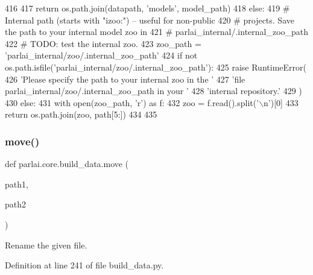 \begin{DoxyCode}
416 
417         \textcolor{keywordflow}{return} os.path.join(datapath, \textcolor{stringliteral}{'models'}, model\_path)
418     \textcolor{keywordflow}{else}:
419         \textcolor{comment}{# Internal path (starts with "izoo:") -- useful for non-public}
420         \textcolor{comment}{# projects.  Save the path to your internal model zoo in}
421         \textcolor{comment}{# parlai\_internal/.internal\_zoo\_path}
422         \textcolor{comment}{# TODO: test the internal zoo.}
423         zoo\_path = \textcolor{stringliteral}{'parlai\_internal/zoo/.internal\_zoo\_path'}
424         \textcolor{keywordflow}{if} \textcolor{keywordflow}{not} os.path.isfile(\textcolor{stringliteral}{'parlai\_internal/zoo/.internal\_zoo\_path'}):
425             \textcolor{keywordflow}{raise} RuntimeError(
426                 \textcolor{stringliteral}{'Please specify the path to your internal zoo in the '}
427                 \textcolor{stringliteral}{'file parlai\_internal/zoo/.internal\_zoo\_path in your '}
428                 \textcolor{stringliteral}{'internal repository.'}
429             )
430         \textcolor{keywordflow}{else}:
431             with open(zoo\_path, \textcolor{stringliteral}{'r') as f:}
432 \textcolor{stringliteral}{                zoo = f.read().split('\(\backslash\)n'})[0]
433             \textcolor{keywordflow}{return} os.path.join(zoo, path[5:])
434 
435 
\end{DoxyCode}
\mbox{\label{namespaceparlai_1_1core_1_1build__data_a1678b8a042eeb9d9c8e9de08f52e496b}} 
\subsubsection{\texorpdfstring{move()}{move()}}
{\footnotesize\ttfamily def parlai.\+core.\+build\+\_\+data.\+move (\begin{DoxyParamCaption}\item[{}]{path1,  }\item[{}]{path2 }\end{DoxyParamCaption})}

\begin{DoxyVerb}Rename the given file.
\end{DoxyVerb}
 

Definition at line 241 of file build\+\_\+data.\+py.


